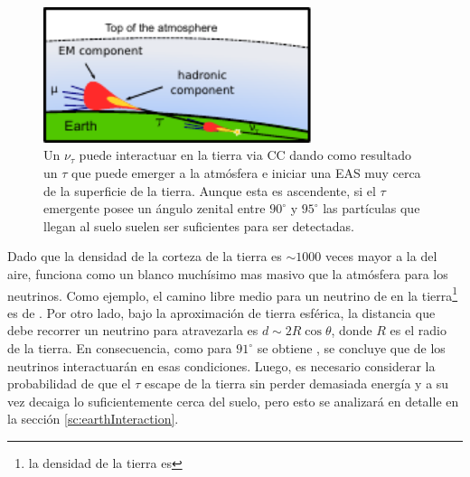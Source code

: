\begin{figure}[ht]
\begin{center}
\includegraphics[width=0.7\textwidth]{fig/EASAuger/horizontal_es_english.pdf}
\caption{Un $\nu_{\tau}$ puede interactuar en la tierra via CC dando como resultado un $\tau$ que puede emerger a la atmósfera e iniciar una EAS muy cerca de la superficie de la tierra.
Aunque esta es ascendente, si el $\tau$ emergente posee un ángulo zenital entre $90^\circ$ y $95^\circ$ las partículas que llegan al suelo suelen ser suficientes para ser detectadas.}
\label{fig:esNu}
\end{center}
\end{figure}

Dado que la densidad de la corteza de la tierra es $\sim1000$ veces mayor a la del aire, funciona como un blanco muchísimo mas masivo que la atmósfera para los neutrinos.
Como ejemplo, el camino libre medio para un neutrino de  en la tierra\footnote{la densidad de la tierra es } es de .
Por otro lado, bajo la aproximación de tierra esférica, la distancia que debe recorrer un neutrino para atravezarla es $d\sim2R\cos{\theta}$, donde $R$ es el radio de la tierra. 
En consecuencia, como para $91^{\circ}$ se obtiene , se concluye que  de los neutrinos interactuarán en esas condiciones.
Luego, es necesario considerar la probabilidad de que el $\tau$ escape de la tierra sin perder demasiada energía y a su vez decaiga lo suficientemente cerca del suelo, pero esto se analizará en detalle en la sección \ref{sc:earthInteraction}.

